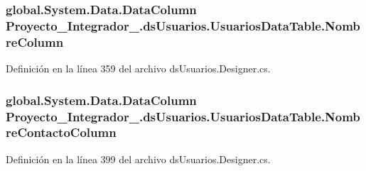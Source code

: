 \hypertarget{class_proyecto___integrador__3_1_1ds_usuarios_1_1_usuarios_data_table_aa73ca2ed9aaabb05af840aac3bd943f5}{
\subsubsection[{Nombre\-Column}]{\setlength{\rightskip}{0pt plus 5cm}global.\-System.\-Data.\-Data\-Column Proyecto\-\_\-\-Integrador\-\_.\-ds\-Usuarios.\-Usuarios\-Data\-Table.\-Nombre\-Column\hspace{0.3cm}{\ttfamily [get]}}}\label{class_proyecto___integrador__3_1_1ds_usuarios_1_1_usuarios_data_table_aa73ca2ed9aaabb05af840aac3bd943f5}


Definición en la línea 359 del archivo ds\-Usuarios.\-Designer.\-cs.

\hypertarget{class_proyecto___integrador__3_1_1ds_usuarios_1_1_usuarios_data_table_ad0071571b88896ada8f0747ec5e441e2}{
\subsubsection[{Nombre\-Contacto\-Column}]{\setlength{\rightskip}{0pt plus 5cm}global.\-System.\-Data.\-Data\-Column Proyecto\-\_\-\-Integrador\-\_.\-ds\-Usuarios.\-Usuarios\-Data\-Table.\-Nombre\-Contacto\-Column\hspace{0.3cm}{\ttfamily [get]}}}\label{class_proyecto___integrador__3_1_1ds_usuarios_1_1_usuarios_data_table_ad0071571b88896ada8f0747ec5e441e2}


Definición en la línea 399 del archivo ds\-Usuarios.\-Designer.\-cs.

